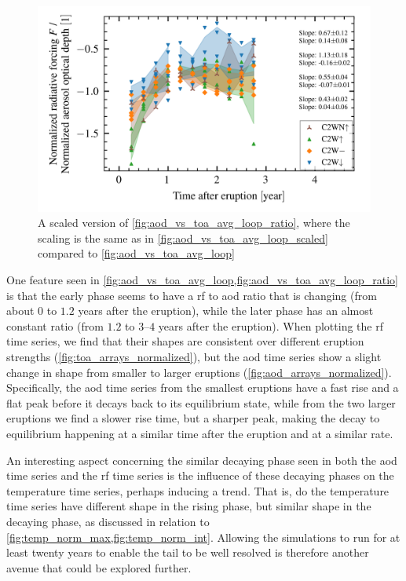 \documentclass{ametsocV5}
\begin{document}
\begin{figure}[t]
  \begin{center}
    \includegraphics[width=0.95\linewidth]{figures/aod_vs_toa_avg_loop_ratio_scaled.png}
  \end{center}
  \caption{
    A scaled version of \cref{fig:aod_vs_toa_avg_loop_ratio}, where the scaling is the
    same as in \cref{fig:aod_vs_toa_avg_loop_scaled} compared to
    \cref{fig:aod_vs_toa_avg_loop}
  }%
  \label{fig:aod_vs_toa_avg_loop_ratio_scaled}
\end{figure}

One feature seen in \cref{fig:aod_vs_toa_avg_loop,fig:aod_vs_toa_avg_loop_ratio} is that
the early phase seems to have a \ac{rf} to \ac{aod} ratio that is changing (from about
\(0\) to \(1.2\) years after the eruption), while the later phase has an almost constant
ratio (from \(1.2\) to \(3\)--\(4\) years after the eruption). When plotting the \ac{rf}
time series, we find that their shapes are consistent over different eruption strengths
(\cref{fig:toa_arrays_normalized}), but the \ac{aod} time series show a slight change in
shape from smaller to larger eruptions (\cref{fig:aod_arrays_normalized}). Specifically,
the \ac{aod} time series from the smallest eruptions have a fast rise and a flat peak
before it decays back to its equilibrium state, while from the two larger eruptions we
find a slower rise time, but a sharper peak, making the decay to equilibrium happening
at a similar time after the eruption and at a similar rate.

An interesting aspect concerning the similar decaying phase seen in both the \ac{aod}
time series and the \ac{rf} time series is the influence of these decaying phases on the
temperature time series, perhaps inducing a trend. That is, do the temperature time
series have different shape in the rising phase, but similar shape in the decaying
phase, as discussed in relation to \cref{fig:temp_norm_max,fig:temp_norm_int}. Allowing
the simulations to run for at least twenty years to enable the tail to be well resolved
is therefore another avenue that could be explored further.
\end{document}
